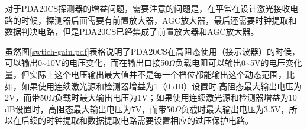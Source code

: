 对于PDA20CS探测器的增益问题，需要注意的问题是，在平常在设计激光接收电路的时候，探测器后面需要有前置放大器，AGC放大器，最后还需要时钟提取和数据判决电路，但是PDA20CS已经集成了前置放大器和AGC放大器。

虽然图\ref{swtich-gain.pdf}表格说明了PDA20CS在高阻态使用（接示波器）的时候，可以输出0\textasciitilde10V的电压变化，而在输出口接50$ \Omega $负载电阻可以输出0\textasciitilde5V的电压变化量，但实际上这个电压输出最大值并不是每一个档位都能输出这个动态范围，比如，如果使用连续激光源和检测器增益为1（0 dB）设置时,高阻态最大输出电压为2V，而带50$ \Omega $负载时最大输出电压为1V；如果使用连续激光源和检测器增益为10 dB设置时，高阻态最大输出电压为7V，而带50$ \Omega $负载时最大输出电压为3.5V，所以在后续的时钟提取和数据提取电路需要设置相应的过压保护电路。








